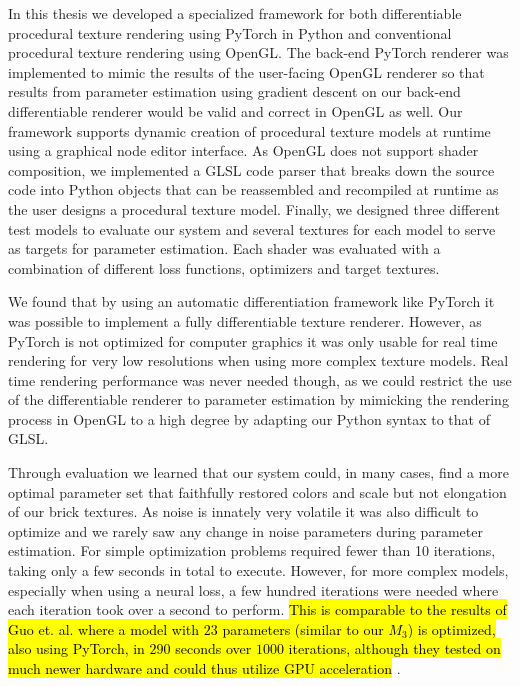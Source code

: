 In this thesis we developed a specialized framework for both differentiable procedural texture rendering using PyTorch in Python and conventional procedural texture rendering using OpenGL. The back-end PyTorch renderer was implemented to mimic the results of the user-facing OpenGL renderer so that results from parameter estimation using gradient descent on our back-end differentiable renderer would be valid and correct in OpenGL as well. Our framework supports dynamic creation of procedural texture models at runtime using a graphical node editor interface. As OpenGL does not support shader composition, we implemented a GLSL code parser that breaks down the source code into Python objects that can be reassembled and recompiled at runtime as the user designs a procedural texture model. Finally, we designed three different test models to evaluate our system and several textures for each model to serve as targets for parameter estimation. Each shader was evaluated with a combination of different loss functions, optimizers and target textures.

We found that by using an automatic differentiation framework like PyTorch it was possible to implement a fully differentiable texture renderer. However, as PyTorch is not optimized for computer graphics it was only usable for real time rendering for very low resolutions when using more complex texture models. Real time rendering performance was never needed though, as we could restrict the use of the differentiable renderer to parameter estimation by mimicking the rendering process in OpenGL to a high degree by adapting our Python syntax to that of GLSL.

Through evaluation we learned that our system could, in many cases, find a more optimal parameter set that faithfully restored colors and scale but not elongation of our brick textures. As noise is innately very volatile it was also difficult to optimize and we rarely saw any change in noise parameters during parameter estimation. For simple optimization problems \dipter{} required fewer than 10 iterations, taking only a few seconds in total to execute. However, for more complex models, especially when using a neural loss, a few hundred iterations were needed where each iteration took over a second to perform. \hl{This is comparable to the results of Guo et. al. where a model with $23$ parameters (similar to our $M_3$) is optimized, also using PyTorch, in $290$ seconds over $1000$ iterations, although they tested on much newer hardware and could thus utilize GPU acceleration} \cite{guo_2019_a}.

